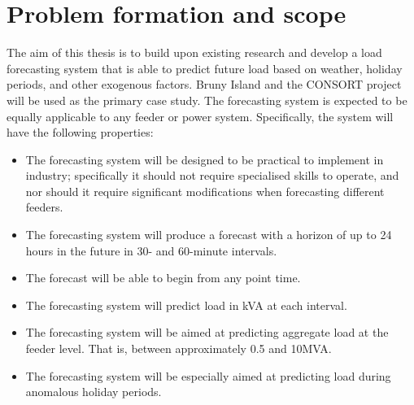 \section{Problem formation and scope}
\label{scope}
The aim of this thesis is to build upon existing research and develop a load forecasting system that is able to predict future load based on weather, holiday periods, and other exogenous factors. 
Bruny Island and the CONSORT project will be used as the primary case study. 
The forecasting system is expected to be equally applicable to any feeder or power system.
Specifically, the system will have the following properties:
\begin{itemize}
	\item The forecasting system will be designed to be practical to implement in industry; specifically it should not require specialised skills to operate, and nor should it require significant modifications when forecasting different feeders.
	\item The forecasting system will produce a forecast with a horizon of up to 24 hours in the future in 30- and 60-minute intervals.
	\item The forecast will be able to begin from any point time.
	\item The forecasting system will predict load in kVA at each interval.
	\item The forecasting system will be aimed at predicting aggregate load at the feeder level. That is, between approximately 0.5 and 10MVA.
	\item The forecasting system will be especially aimed at predicting load during anomalous holiday periods.
\end{itemize}
